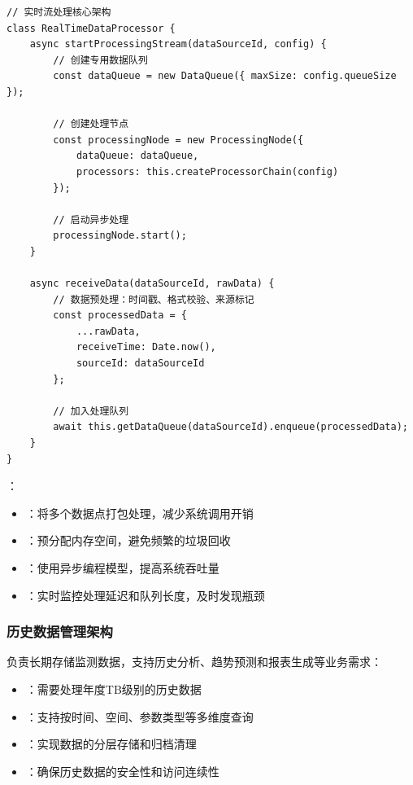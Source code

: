 \begin{lstlisting}[style=javascript]
// 实时流处理核心架构
class RealTimeDataProcessor {
    async startProcessingStream(dataSourceId, config) {
        // 创建专用数据队列
        const dataQueue = new DataQueue({ maxSize: config.queueSize });
        
        // 创建处理节点
        const processingNode = new ProcessingNode({
            dataQueue: dataQueue,
            processors: this.createProcessorChain(config)
        });
        
        // 启动异步处理
        processingNode.start();
    }
    
    async receiveData(dataSourceId, rawData) {
        // 数据预处理：时间戳、格式校验、来源标记
        const processedData = {
            ...rawData,
            receiveTime: Date.now(),
            sourceId: dataSourceId
        };
        
        // 加入处理队列
        await this.getDataQueue(dataSourceId).enqueue(processedData);
    }
}
\end{lstlisting}

：

\begin{itemize}
\tightlist
\item
  ：将多个数据点打包处理，减少系统调用开销
\item
  ：预分配内存空间，避免频繁的垃圾回收
\item
  ：使用异步编程模型，提高系统吞吐量
\item
  ：实时监控处理延迟和队列长度，及时发现瓶颈
\end{itemize}

\hypertarget{ux5386ux53f2ux6570ux636eux7ba1ux7406ux67b6ux6784}{%
\subsubsection{历史数据管理架构}\label{ux5386ux53f2ux6570ux636eux7ba1ux7406ux67b6ux6784}}

负责长期存储监测数据，支持历史分析、趋势预测和报表生成等业务需求：

\begin{itemize}
\tightlist
\item
  ：需要处理年度TB级别的历史数据
\item
  ：支持按时间、空间、参数类型等多维度查询
\item
  ：实现数据的分层存储和归档清理
\item
  ：确保历史数据的安全性和访问连续性
\end{itemize}

